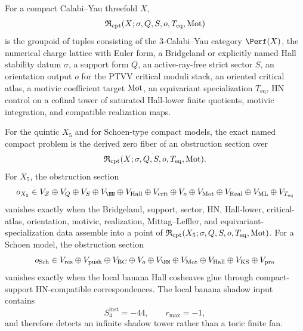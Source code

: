 \begin{definition}
\label{def:bps-positive-compact-realization-datum}
For a compact Calabi--Yau threefold \(X\),
\[
\mathfrak R_{\mathrm{cpt}}(X;\sigma,Q,S,o,T_{\mathrm{eq}},\mathrm{Mot})
\]
is the groupoid of tuples consisting of the \(3\)-Calabi--Yau category
\(\Perf(X)\), the numerical charge lattice with Euler form, a
Bridgeland or explicitly named Hall stability datum \(\sigma\), a
support form \(Q\), an active-ray-free strict sector \(S\), an
orientation output \(o\) for the PTVV critical moduli stack, an oriented
critical atlas, a motivic coefficient target \(\mathrm{Mot}\), an equivariant
specialization \(T_{\mathrm{eq}}\), HN control on a cofinal tower of
saturated Hall-lower finite quotients, motivic integration, and
compatible realization maps.
\end{definition}

\begin{proposition}
\label{prop:bps-positive-quintic-schoen-obstruction-quotients}
For the quintic \(X_5\) and for Schoen-type compact models, the exact
named compact problem is the derived zero fiber of an obstruction
section over
\[
\mathfrak R_{\mathrm{cpt}}(X;\sigma,Q,S,o,T_{\mathrm{eq}},\mathrm{Mot}).
\]
For \(X_5\), the obstruction section
\[
o_{X_5}\in
V_{Z}\oplus V_Q\oplus V_S\oplus V_{\HN}\oplus V_{\mathrm{Hall}}
\oplus V_{\mathrm{crit}}\oplus V_o\oplus V_{\Mot}\oplus
V_{\Real}\oplus V_{\mathrm{ML}}\oplus V_{T_{\mathrm{eq}}}
\]
vanishes exactly when the Bridgeland, support, sector, HN,
Hall-lower, critical-atlas, orientation, motivic, realization,
Mittag--Leffler, and equivariant-specialization data assemble into a
point of \(\mathfrak R_{\mathrm{cpt}}(X_5;\sigma,Q,S,o,T_{\mathrm{eq}},
\mathrm{Mot})\). For a Schoen model, the obstruction section
\[
o_{\mathrm{Sch}}\in
V_{\mathrm{res}}\oplus V_{\mathrm{push}}\oplus V_{\mathrm{BC}}
\oplus V_o\oplus V_{\HN}\oplus V_{\Mot}\oplus V_{\mathrm{Hall}}
\oplus V_{\KS}\oplus V_{\mathrm{pro}}
\]
vanishes exactly when the local banana Hall cosheaves glue through
compact-support HN-compatible correspondences. The local banana shadow
input contains
\[
S_4^{\mathrm{inst}}=-44,
\qquad
r_{\max}=-1,
\]
and therefore detects an infinite shadow tower rather than a toric
finite fan.
\end{proposition}

